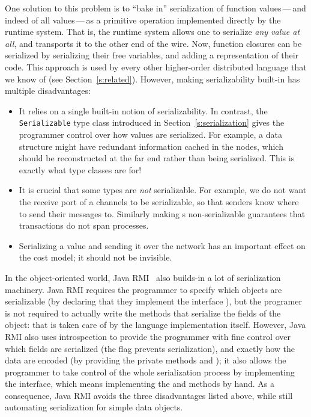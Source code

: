 \documentclass[preprint]{sigplanconf}
\begin{document}
One solution to this problem is to ``bake in'' serialization of
function values\,---\,and indeed of all values\,---\,as a primitive operation
implemented directly by the runtime system.  That is, the runtime system
allows one to serialize \emph{any value at all}, and transports it to the 
other end of the wire.  
Now, function closures can be serialized by
serializing their free variables, and adding a representation of their code.
This approach is used by every other 
higher-order distributed language that we know of (see Section~\ref{s:related}).
However, making serializability built-in
has multiple disadvantages:
\begin{itemize}
\item It relies on a single built-in notion of serializability.
In contrast, the \texttt{Serializable} type class introduced in 
Section~\ref{s:serialization} gives the programmer control over how
values are serialized.  For example, a data structure might have
redundant information cached in the nodes, which should be reconstructed
at the far end rather than being serialized.  
This is exactly what type
classes are for!
\item It is crucial that some types are \emph{not} serializable. For
example, we do not want the receive port of a channels to be serializable, 
so that senders know where to send their messages to.  Similarly making 
s non-serializable guarantees that  transactions 
do not span processes.
\item Serializing a value and sending it over the network has an important
effect on the cost model; it should not be invisible.
\end{itemize}
\noindent
In the object-oriented world, Java RMI~\cite{javarmi} also builds-in a lot of serialization machinery.  
Java RMI requires the programmer to specify which objects are serializable (by declaring that they implement the interface ), but the programer is not required to actually write the methods that serialize the fields of the object: that is taken care of by the language implementation itself.
However, Java RMI also uses introspection to provide the programmer with fine control over
which fields are serialized (the  flag prevents serialization), and exactly how the data are encoded (by providing the private methods  and ); it also allows the programmer to take control of the whole serialization process by implementing the  interface, which means implementing the  and  methods by hand. 
As a consequence, Java RMI avoids the three disadvantages listed above, while still automating serialization for simple data objects.
\end{document}

